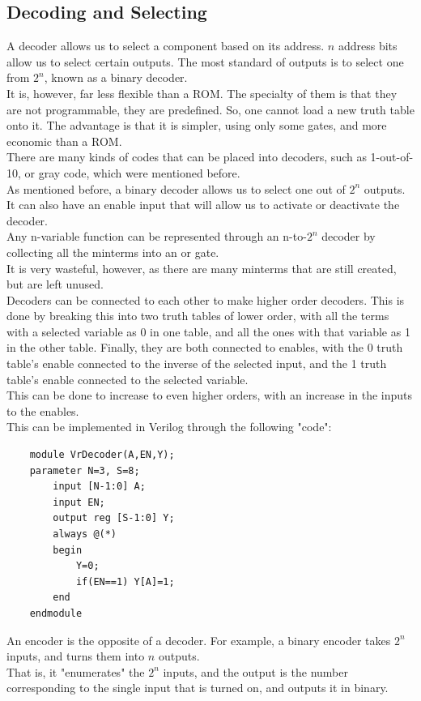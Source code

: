 \documentclass[nobib]{tufte-handout}
\begin{document}
    \subsection{Decoding and Selecting}
    A decoder allows us to select a component based on its address. $n$ address
    bits allow us to select certain outputs. The most standard of outputs is to
    select one from $2^n$, known as a binary decoder.\\ It is, however, far less
    flexible than a ROM. The specialty of them is that they are not programmable,
    they are predefined. So, one cannot load a new truth table onto it. The
    advantage is that it is simpler, using only some gates, and more economic than
    a ROM.\\ There are many kinds of codes that can be placed into decoders, such
    as 1-out-of-10, or gray code, which were mentioned before.\\ As mentioned
    before, a binary decoder allows us to select one out of $2^n$ outputs. It can
    also have an enable input that will allow us to activate or deactivate the
    decoder.\\ Any n-variable function can be represented through an n-to-$2^n$
decoder by collecting all the minterms into an or gate.\\ It is very wasteful,
however, as there are many minterms that are still created, but are left
unused.\\ Decoders can be connected to each other to make higher order
decoders. This is done by breaking this into two truth tables of lower order,
with all the terms with a selected variable as 0 in one table, and all the ones
with that variable as 1 in the other table. Finally, they are both connected to
enables, with the 0 truth table's enable connected to the inverse of the
selected input, and the 1 truth table's enable connected to the selected
variable.\\
This can be done to increase to even higher orders, with an increase in the inputs to the enables.\\
This can be implemented in Verilog through the following "code":
\begin{lstlisting}
    module VrDecoder(A,EN,Y);
    parameter N=3, S=8;
        input [N-1:0] A;
        input EN;
        output reg [S-1:0] Y;
        always @(*)
        begin
            Y=0;
            if(EN==1) Y[A]=1;
        end
    endmodule
\end{lstlisting}

An encoder is the opposite of a decoder. For example, a binary encoder takes $2^n$ inputs, and turns them into $n$ outputs.\\
That is, it "enumerates" the $2^n$ inputs, and the output is the number corresponding to the single input that is turned on, and outputs it in binary.\\
\end{document}
